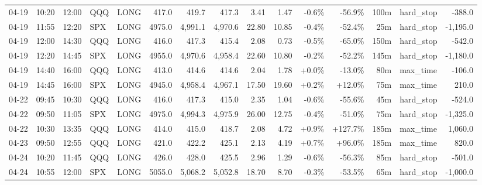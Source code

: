 \documentclass[11pt,a4paper,twoside]{article}
\begin{document}
\begin{landscape}
\begin{center}
\begin{longtable}{>{\color{txtmain}}l l l l l r r r r r r r r >{\color{txtmain}}l r}
04-19 & 10:20 & 12:00 & QQQ & LONG & 417.0 & 419.7 & 417.3 & 3.41 & 1.47 & \textcolor{lossred}{-0.6\%} & \textcolor{lossred}{-56.9\%} & 100m & hard\_stop & \textcolor{lossred}{-388.0} \\
04-19 & 11:55 & 12:20 & SPX & LONG & 4975.0 & 4,991.1 & 4,970.6 & 22.80 & 10.85 & \textcolor{lossred}{-0.4\%} & \textcolor{lossred}{-52.4\%} & 25m & hard\_stop & \textcolor{lossred}{-1,195.0} \\
04-19 & 12:00 & 14:30 & QQQ & LONG & 416.0 & 417.3 & 415.4 & 2.08 & 0.73 & \textcolor{lossred}{-0.5\%} & \textcolor{lossred}{-65.0\%} & 150m & hard\_stop & \textcolor{lossred}{-542.0} \\
04-19 & 12:20 & 14:45 & SPX & LONG & 4955.0 & 4,970.6 & 4,958.4 & 22.60 & 10.80 & \textcolor{lossred}{-0.2\%} & \textcolor{lossred}{-52.2\%} & 145m & hard\_stop & \textcolor{lossred}{-1,180.0} \\
04-19 & 14:40 & 16:00 & QQQ & LONG & 413.0 & 414.6 & 414.6 & 2.04 & 1.78 & \textcolor{wingreen}{+0.0\%} & \textcolor{lossred}{-13.0\%} & 80m & max\_time & \textcolor{lossred}{-106.0} \\
04-19 & 14:45 & 16:00 & SPX & LONG & 4945.0 & 4,958.4 & 4,967.1 & 17.50 & 19.60 & \textcolor{wingreen}{+0.2\%} & \textcolor{wingreen}{+12.0\%} & 75m & max\_time & \textcolor{wingreen}{210.0} \\
04-22 & 09:45 & 10:30 & QQQ & LONG & 416.0 & 417.3 & 415.0 & 2.35 & 1.04 & \textcolor{lossred}{-0.6\%} & \textcolor{lossred}{-55.6\%} & 45m & hard\_stop & \textcolor{lossred}{-524.0} \\
04-22 & 09:50 & 11:05 & SPX & LONG & 4975.0 & 4,994.3 & 4,975.9 & 26.00 & 12.75 & \textcolor{lossred}{-0.4\%} & \textcolor{lossred}{-51.0\%} & 75m & hard\_stop & \textcolor{lossred}{-1,325.0} \\
04-22 & 10:30 & 13:35 & QQQ & LONG & 414.0 & 415.0 & 418.7 & 2.08 & 4.72 & \textcolor{wingreen}{+0.9\%} & \textcolor{wingreen}{+127.7\%} & 185m & max\_time & \textcolor{wingreen}{1,060.0} \\
04-23 & 09:50 & 12:55 & QQQ & LONG & 421.0 & 422.2 & 425.1 & 2.13 & 4.19 & \textcolor{wingreen}{+0.7\%} & \textcolor{wingreen}{+96.0\%} & 185m & max\_time & \textcolor{wingreen}{820.0} \\
04-24 & 10:20 & 11:45 & QQQ & LONG & 426.0 & 428.0 & 425.5 & 2.96 & 1.29 & \textcolor{lossred}{-0.6\%} & \textcolor{lossred}{-56.3\%} & 85m & hard\_stop & \textcolor{lossred}{-501.0} \\
04-24 & 10:55 & 12:00 & SPX & LONG & 5055.0 & 5,068.2 & 5,052.8 & 18.70 & 8.70 & \textcolor{lossred}{-0.3\%} & \textcolor{lossred}{-53.5\%} & 65m & hard\_stop & \textcolor{lossred}{-1,000.0} \\

\end{longtable}
\end{center}
\end{landscape}
\end{document}
